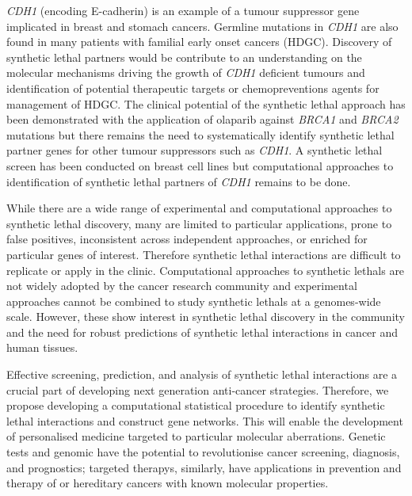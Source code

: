 \textit{CDH1} (encoding \gls{E-cadherin}) is an example of a \gls{tumour suppressor} gene implicated in  breast and stomach cancers. Germline \glspl{mutation} in \textit{CDH1} are also found in many patients with \gls{familial} early onset cancers (\gls{HDGC}). Discovery of \gls{synthetic lethal} partners would be contribute to an understanding on the molecular mechanisms driving the growth of \textit{CDH1} deficient \glspl{tumour} and identification of potential therapeutic targets or \glspl{chemoprevention} agents for management of \gls{HDGC}. The clinical potential of the \gls{synthetic lethal} approach has been demonstrated with the application of olaparib against \textit{BRCA1} and \textit{BRCA2} \glspl{mutation} \citep{Lord2014} but there remains the need to systematically identify \gls{synthetic lethal} partner genes for other \glspl{tumour suppressor} such as \textit{CDH1}. A \gls{synthetic lethal} screen has been conducted on breast cell lines \citep{Telford2015} but computational approaches to identification of \gls{synthetic lethal} partners of \textit{CDH1} remains to be done.  


While there are a wide range of experimental and computational approaches to \gls{synthetic lethal} discovery, many are limited to particular applications, prone to false positives, inconsistent across independent approaches, or enriched for particular genes of interest. Therefore \gls{synthetic lethal} interactions are difficult to replicate or apply in the clinic. Computational approaches to \glspl{synthetic lethal} are not widely adopted by the cancer research community and experimental approaches cannot be combined to study \glspl{synthetic lethal} at a \glspl{genome}-wide scale. However, these show interest in \gls{synthetic lethal} discovery in the community and the need for robust predictions of \gls{synthetic lethal} interactions in cancer and human tissues.

Effective screening, prediction, and analysis of \gls{synthetic lethal} interactions are a crucial part of developing next generation anti-cancer strategies. Therefore, we propose developing a computational statistical procedure to identify \gls{synthetic lethal} interactions and construct gene networks. This will enable the development of personalised medicine targeted to particular molecular aberrations. Genetic tests and \gls{genomic} have the potential to revolutionise cancer screening, diagnosis, and prognostics; \glspl{targeted therapy}, similarly, have applications in prevention and therapy of  or \gls{hereditary} cancers with known molecular properties.

